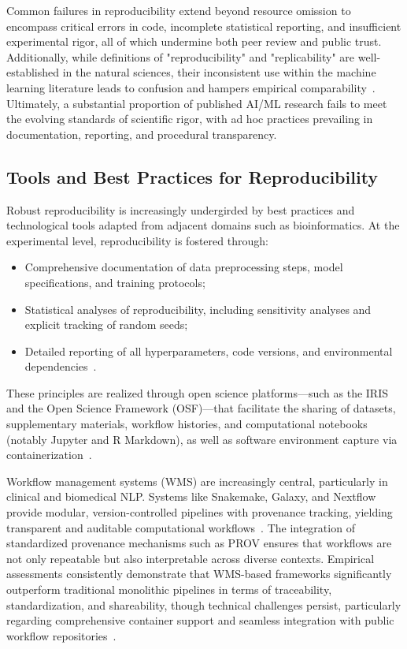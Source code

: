 Common failures in reproducibility extend beyond resource omission to encompass critical errors in code, incomplete statistical reporting, and insufficient experimental rigor, all of which undermine both peer review and public trust. Additionally, while definitions of "reproducibility" and "replicability" are well-established in the natural sciences, their inconsistent use within the machine learning literature leads to confusion and hampers empirical comparability~\cite{ref108}. Ultimately, a substantial proportion of published AI/ML research fails to meet the evolving standards of scientific rigor, with ad hoc practices prevailing in documentation, reporting, and procedural transparency.

\subsection{Tools and Best Practices for Reproducibility}

Robust reproducibility is increasingly undergirded by best practices and technological tools adapted from adjacent domains such as bioinformatics. At the experimental level, reproducibility is fostered through:

\begin{itemize}
  \item Comprehensive documentation of data preprocessing steps, model specifications, and training protocols;
  \item Statistical analyses of reproducibility, including sensitivity analyses and explicit tracking of random seeds;
  \item Detailed reporting of all hyperparameters, code versions, and environmental dependencies~\cite{ref108}.
\end{itemize}

These principles are realized through open science platforms---such as the IRIS and the Open Science Framework (OSF)---that facilitate the sharing of datasets, supplementary materials, workflow histories, and computational notebooks (notably Jupyter and R Markdown), as well as software environment capture via containerization~\cite{ref108}.

Workflow management systems (WMS) are increasingly central, particularly in clinical and biomedical NLP. Systems like Snakemake, Galaxy, and Nextflow provide modular, version-controlled pipelines with provenance tracking, yielding transparent and auditable computational workflows~\cite{ref12,ref13,ref24,ref25,ref28,ref29,ref32,ref33,ref34,ref39,ref44,ref46,ref50,ref58,ref65}. The integration of standardized provenance mechanisms such as PROV ensures that workflows are not only repeatable but also interpretable across diverse contexts. Empirical assessments consistently demonstrate that WMS-based frameworks significantly outperform traditional monolithic pipelines in terms of traceability, standardization, and shareability, though technical challenges persist, particularly regarding comprehensive container support and seamless integration with public workflow repositories~\cite{ref65}.

